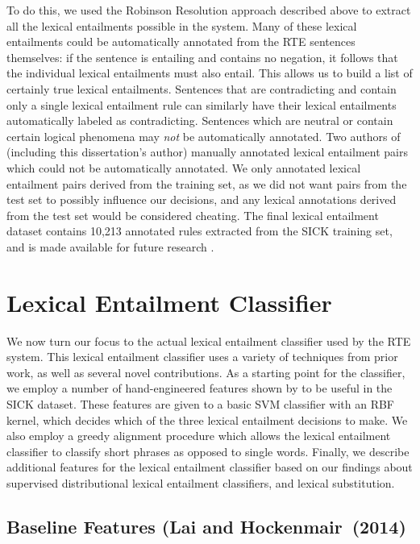 To do this, we used the Robinson Resolution approach described above to extract
all the lexical entailments possible in the system. Many of these lexical
entailments could be automatically annotated from the RTE sentences themselves:
if the sentence is entailing and contains no negation, it follows that the
individual lexical entailments must also entail. This allows us to build a list
of certainly true lexical entailments. Sentences that are contradicting and
contain only a single lexical entailment rule can similarly have their lexical
entailments automatically labeled as contradicting. Sentences which are neutral
or contain certain logical phenomena may {\em not} be automatically annotated.
Two authors of  (including this
dissertation's author) manually annotated lexical entailment pairs which
could not be automatically annotated.
We only annotated lexical entailment pairs derived
from the training set, as we did not want pairs from the test set to possibly
influence our decisions, and any lexical annotations derived from the test set
would be considered cheating. The final lexical entailment dataset contains
10,213 annotated rules extracted from the SICK training set, and is made available
for future research \cite{beltagy:2016:cl}.

\section{Lexical Entailment Classifier}

We now turn our focus to the actual lexical entailment classifier used by the
RTE system. This lexical entailment classifier uses a variety of techniques
from prior work, as well as several novel contributions. As a starting point for
the classifier, we employ a number of hand-engineered features
shown by  to be useful in the SICK dataset. These
features are given to a basic SVM classifier with an RBF kernel, which
decides which of the three lexical entailment decisions to make. We also
employ a greedy alignment procedure which allows the lexical entailment
classifier to classify short phrases as opposed to single words.
Finally, we describe additional features for the lexical entailment classifier
based on our findings about supervised distributional lexical entailment
classifiers, and lexical substitution.

\subsection{Baseline Features (Lai and Hockenmair~(2014)}

